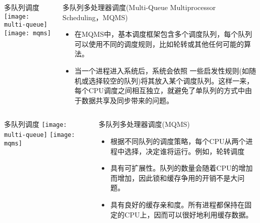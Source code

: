 \begin{frame}
	\begin{columns}
		\begin{column}{.5\textwidth}
			\Large \centering
			多队列调度
			\texttt{[image: multi-queue]}
			\texttt{[image: mqms]}	
		\end{column}
		
		\begin{column}{.5\textwidth}
			\large
			多队列多处理器调度(Multi-Queue Multiprocessor Scheduling，MQMS) \\
			\normalsize
			\begin{itemize}
			\item 在MQMS中，基本调度框架包含多个调度队列，每个队列可以使用不同的调度规则，比如轮转或其他任何可能的算法。
			
			\item 当一个进程进入系统后，系统会依照 一些启发性规则(如随机或选择较空的队列)将其放入某个调度队列。这样一来，每个CPU调度之间相互独立，就避免了单队列的方式中由于数据共享及同步带来的问题。
			\end{itemize}
		\end{column}
	\end{columns}
\end{frame}


\begin{frame}
	\begin{columns}
		\begin{column}{.5\textwidth}
			\Large \centering
			多队列调度
			\texttt{[image: multi-queue]}
			\texttt{[image: mqms]}	
		\end{column}
		
		\begin{column}{.5\textwidth}
			\large
			多队列多处理器调度(MQMS) 
			\normalsize
			\begin{itemize}
			\item 根据不同队列的调度策略，每个CPU从两个进程中选择，决定谁将运行。例如，轮转调度
			\item 具有可扩展性。队列的数量会随着CPU的增加而增加，因此锁和缓存争用的开销不是大问题。
			\item 具有良好的缓存亲和度。所有进程都保持在固定的CPU上，因而可以很好地利用缓存数据。
			\end{itemize}
		\end{column}
	\end{columns}
\end{frame}


